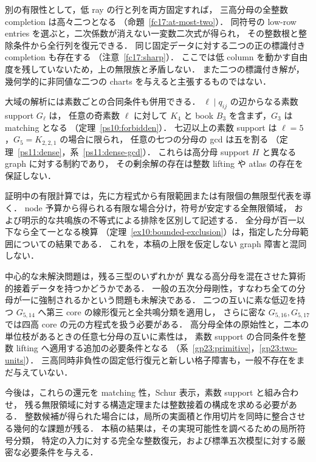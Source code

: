 別の有限性として，低 ray の行と列を両方固定すれば，
三高分母の全整数 completion は高々二つとなる
（命題~\ref{fc17:at-most-two}）．
同符号の low-row entries を選ぶと，二次係数が消えない一変数二次式が得られ，
その整数根と整除条件から全行列を復元できる．
同じ固定データに対する二つの正の標識付き completion も存在する
（注意~\ref{fc17:sharp}）．
ここでは低 column を動かす自由度を残していないため，上の無限族と矛盾しない．
また二つの標識付き解が，幾何学的に非同値な二つの charts を与えると主張するものではない．

大域の解析には素数ごとの合同条件も併用できる．
$\ell\mid q_{ij}$ の辺からなる素数 support $G_\ell$ は，
任意の奇素数 $\ell$ に対して $K_4$ と book $B_3$ を含まず，$G_3$ は matching となる
（定理~\ref{ps10:forbidden}）．
七辺以上の素数 support は $\ell=5$，$G_5=K_{2,2,1}$ の場合に限られ，
任意の七つの分母の gcd は五を割る
（定理~\ref{ps11:dense}，系~\ref{ps11:dense-gcd}）．
これらは高分母 support $H$ と異なる graph に対する制約であり，
その剰余解の存在は整数 lifting や atlas の存在を保証しない．

証明中の有限計算では，先に方程式から有限範囲または有限個の無限型代表を導く．
node 予算から得られる有限な場合分け，符号が安定する全無限領域，
および明示的な共鳴族の不等式による排除を区別して記述する．
全分母が百一以下なら全て一となる検算
（定理~\ref{ex10:bounded-exclusion}）は，指定した分母範囲についての結果である．
これを，本稿の上限を仮定しない graph 障害と混同しない．

中心的な未解決問題は，残る三型のいずれかが
異なる高分母を混在させた算術的接着データを持つかどうかである．
一般の五次分母剛性，すなわち全ての分母が一に強制されるかという問題も未解決である．
二つの互いに素な低辺を持つ $G_{5,14}$ へ第三 core の線形復元と全共鳴分類を適用し，
さらに密な $G_{5,16},G_{5,17}$ では四高 core の元の方程式を扱う必要がある．
高分母全体の原始性と，二本の単位枝があるときの任意七分母の互いに素性は，
素数 support の合同条件を整数 lifting へ適用する追加の必要条件となる
（系~\ref{gp23:primitive}，\ref{gp23:two-units}）．
三高同時非負性の固定低行復元と新しい格子障害も，一般不存在をまだ与えていない．

今後は，これらの還元を matching 性，Schur 表示，素数 support と組み合わせ，
残る無限領域に対する構造定理または整数接着の構成を求める必要がある．
整数候補が得られた場合には，局所の実面積と作用切片を同時に整合させる幾何的な課題が残る．
本稿の結果は，その実現可能性を調べるための局所符号分類，
特定の入力に対する完全な整数復元，および標準五次模型に対する厳密な必要条件を与える．
